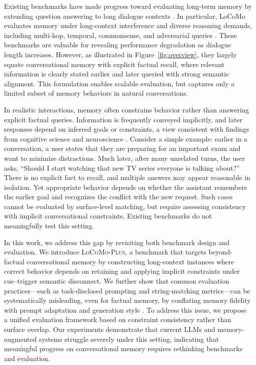 \documentclass[11pt]{article}
\begin{document}
Existing benchmarks have made progress toward evaluating long-term memory by extending question answering to long dialogue contexts
\cite{reddy2019coqa,xu2022beyond,maharana2024evaluating,pan2025memory}.
In particular, LoCoMo evaluates memory under long-context interference and diverse reasoning demands, including multi-hop, temporal, commonsense, and adversarial queries
\cite{maharana2024evaluating}.
These benchmarks are valuable for revealing performance degradation as dialogue length increases.
However, as illustrated in Figure~\ref{fig:overview}, they largely equate conversational memory with explicit factual recall,
where relevant information is clearly stated earlier and later queried with strong semantic alignment.
This formulation enables scalable evaluation, but captures only a limited subset of memory behaviors in natural conversations.

In realistic interactions, memory often constrains behavior rather than answering explicit factual queries.\cite{zheng2025flexible}
Information is frequently conveyed implicitly, and later responses depend on inferred goals or constraints,
a view consistent with findings from cognitive science and neuroscience
\cite{amodio2019social,hoskins2024ai}.
Consider a simple example: earlier in a conversation, a user states that they are preparing for an important exam and want to minimize distractions.
Much later, after many unrelated turns, the user asks, ``Should I start watching that new TV series everyone is talking about?''
There is no explicit fact to recall, and multiple answers may appear reasonable in isolation.
Yet appropriate behavior depends on whether the assistant remembers the earlier goal and recognizes the conflict with the new request.
Such cases cannot be evaluated by surface-level matching, but require assessing consistency with implicit conversational constraints.
Existing benchmarks do not meaningfully test this setting.

In this work, we address this gap by revisiting both benchmark design and evaluation.
We introduce \textsc{LoCoMo-Plus}, a benchmark that targets beyond-factual conversational memory by constructing long-context instances
where correct behavior depends on retaining and applying implicit constraints under cue--trigger semantic disconnect.
We further show that common evaluation practices---such as task-disclosed prompting and string-matching metrics---can be systematically misleading,
even for factual memory, by conflating memory fidelity with prompt adaptation and generation style
\cite{novikova2017we,post2018call}.
To address this issue, we propose a unified evaluation framework based on constraint consistency rather than surface overlap.
Our experiments demonstrate that current LLMs and memory-augmented systems struggle severely under this setting,
indicating that meaningful progress on conversational memory requires rethinking benchmarks and evaluation.
\end{document}
